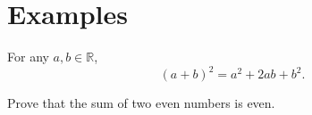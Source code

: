 \documentclass[12pt]{article}
\begin{document}
\section{Examples}

\begin{greentheorem}{}{}
For any $a,b \in \mathbb{R}$,
\[
(a+b)^2 = a^2 + 2ab + b^2.
\]
\end{greentheorem}

\begin{question}{}{}
Prove that the sum of two even numbers is even.
\end{question}
\end{document}
